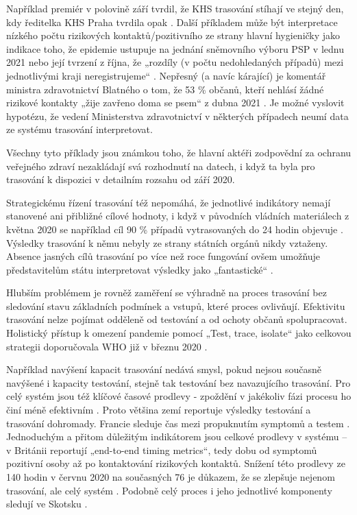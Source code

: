 Například premiér v polovině září tvrdil, že KHS trasování stíhají ve stejný den, kdy ředitelka KHS Praha tvrdila opak \cite{tr_denik_cz}. Další příkladem může být interpretace nízkého počtu rizikových kontaktů/pozitivního ze strany hlavní hygieničky jako indikace toho, že epidemie ustupuje na jednání sněmovního výboru PSP v lednu 2021 \cite{tr_denik_n} nebo její tvrzení z října, že „rozdíly (v počtu nedohledaných případů) mezi jednotlivými kraji neregistrujeme“ \cite{tr_novinky_cz}. Nepřesný (a navíc kárající) je komentář ministra zdravotnictví Blatného o tom, že 53 \% občanů, kteří nehlásí žádné rizikové kontakty „žije zavřeno doma se psem“ z dubna 2021 \cite{tr_tvidnes_cz}. Je možné vyslovit hypotézu, že vedení Ministerstva zdravotnictví v některých případech neumí data ze systému trasování interpretovat. 

Všechny tyto příklady jsou známkou toho, že hlavní aktéři zodpovědní za ochranu veřejného zdraví nezakládají svá rozhodnutí na datech, i když ta byla pro trasování k dispozici v detailním rozsahu od září 2020.

Strategickému řízení trasování též nepomáhá, že jednotlivé indikátory nemají stanovené ani přibližné cílové hodnoty, i když v původních vládních materiálech z května 2020 se například cíl 90 \% případů vytrasovaných do 24 hodin objevuje \cite{tr_vlada01}. Výsledky trasování k němu nebyly ze strany státních orgánů nikdy vztaženy. Absence jasných cílů trasování po více než roce fungování ovšem umožňuje představitelům státu interpretovat výsledky jako „fantastické“ \cite{tr_vlada02}.

Hlubším problémem je rovněž zaměření se výhradně na proces trasování bez sledování stavu základních podmínek a vstupů, které proces ovlivňují. Efektivitu trasování nelze pojímat odděleně od testování a od ochoty občanů spolupracovat. Holistický přístup k omezení pandemie pomocí „Test, trace, isolate“ jako celkovou strategii doporučovala WHO již v březnu 2020 \cite{tr_WHO_02}.

Například navýšení kapacit trasování nedává smysl, pokud nejsou současně navýšené i kapacity testování, stejně tak testování bez navazujícího trasování. Pro celý systém jsou též klíčové časové prodlevy - zpoždění v jakékoliv fázi procesu ho činí méně efektivním \cite{tr_systems_successful_2020}. Proto většina zemí reportuje výsledky testování a trasování dohromady. Francie sleduje čas mezi propuknutím symptomů a testem \cite{tr_france}. Jednoduchým a přitom důležitým indikátorem jsou celkové prodlevy v systému -- v Británii reportují „end-to-end timing metrics“, tedy dobu od symptomů pozitivní osoby až po kontaktování rizikových kontaktů. Snížení této prodlevy ze 140 hodin v červnu 2020 na současných 76 je důkazem, že se zlepšuje nejenom trasování, ale celý systém \cite{tr_gov_uk01}. Podobně celý proces i jeho jednotlivé komponenty sledují ve Skotsku \cite{tr_scotland}.

